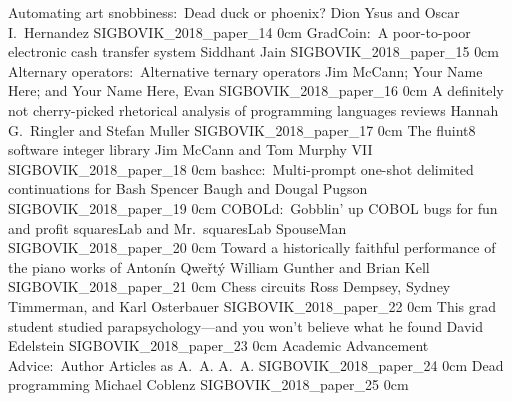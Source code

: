 \addpaper
	{Automating art snobbiness:\ Dead duck or phoenix?}
	{Dion Ysus and Oscar I.\ Hernandez}
	{}
	{SIGBOVIK_2018_paper_14}
	{0cm}
	{}
\addpaper
	{GradCoin:\ A poor-to-poor electronic cash transfer system}
	{Siddhant Jain}
	{}
	{SIGBOVIK_2018_paper_15}
	{0cm}
	{}
\addpaper
	{Alternary operators:\ Alternative ternary operators}
	{Jim McCann; Your Name Here; and Your Name Here, Evan}
	{}
	{SIGBOVIK_2018_paper_16}
	{0cm}
	{}
\addpaper
	{A definitely not cherry-picked rhetorical analysis of programming languages reviews}
	{Hannah G.\ Ringler and Stefan Muller}
	{}
	{SIGBOVIK_2018_paper_17}
	{0cm}
	{}
\addpaper
	{The fluint8 software integer library}
	{Jim McCann and Tom Murphy VII}
	{}
	{SIGBOVIK_2018_paper_18}
	{0cm}
	{}
\addpaper
	{bashcc:\ Multi-prompt one-shot delimited continuations for Bash}
	{Spencer Baugh and Dougal Pugson}
	{}
	{SIGBOVIK_2018_paper_19}
	{0cm}
	{}
\addpaper
	{COBOLd:\ Gobblin' up COBOL bugs for fun and profit}
	{squaresLab and Mr.\ squaresLab SpouseMan}
	{}
	{SIGBOVIK_2018_paper_20}
	{0cm}
	{}
\addpaper
	{Toward a historically faithful performance of the piano works of Anton\'in Qwe\v{r}t\'y}
	{William Gunther and Brian Kell}
	{}
	{SIGBOVIK_2018_paper_21}
	{0cm}
	{}
\addpaper
	{Chess circuits}
	{Ross Dempsey, Sydney Timmerman, and Karl Osterbauer}
	{}
	{SIGBOVIK_2018_paper_22}
	{0cm}
	{}
\addpaper
	{This grad student studied parapsychology---and you won't believe what he found}
	{David Edelstein}
	{}
	{SIGBOVIK_2018_paper_23}
	{0cm}
	{}
\addpaper
	{Academic Advancement Advice:\ Author Articles as A.\ A.}
	{A.\ A.}
	{}
	{SIGBOVIK_2018_paper_24}
	{0cm}
	{}
\addpaper
	{Dead programming}
	{Michael Coblenz}
	{}
	{SIGBOVIK_2018_paper_25}
	{0cm}
	{}
